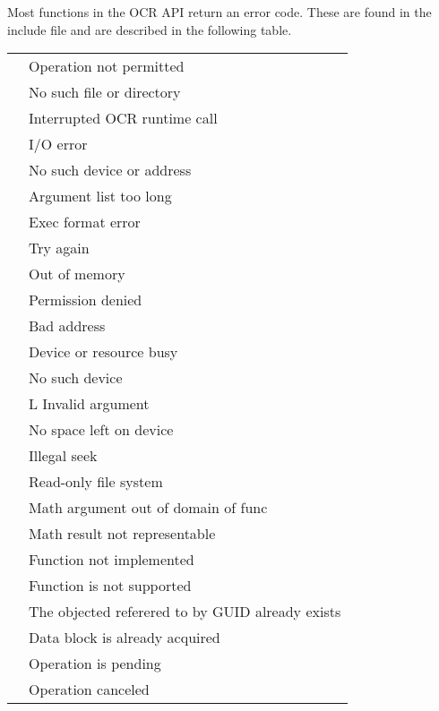 Most functions in the OCR API return an error code.  These are found
in the  include file and are described in the following table.

\tablelasttail{\hline}
\begin{supertabular}{p{1.25in} p{2.75in}}
\label{tab:errorcodes}
 & Operation not permitted\\
 & No such file or directory\\
 & Interrupted OCR runtime call\\
 & I/O error\\
 & No such device or address\\
 & Argument list too long\\
 & Exec format error\\
 & Try again\\
 & Out of memory\\
 & Permission denied\\
 & Bad address\\
 & Device or resource busy\\
 & No such device\\
 &L Invalid argument\\
 & No space left on device\\
 & Illegal seek\\
 & Read-only file system\\
 & Math argument out of domain of func\\
 & Math result not representable\\
 & Function not implemented\\
 & Function is not supported\\
 & The objected referered to by GUID already exists\\
 & Data block is already acquired\\
 & Operation is pending\\
 & Operation canceled\\
\end{supertabular}

